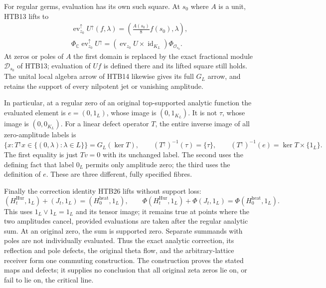 \documentclass[11pt]{article}
\theoremstyle{definition}
\begin{document}
For regular germs, evaluation has its own such square. At $s_0$ where
$A$ is a unit, HTB13 lifts to
\begin{equation}\tag{HTB32}
\begin{gathered}
 \operatorname{ev}_{z_0}^{\uparrow}U^{\uparrow}(f,\lambda)
 =\left(\frac{A(s_0)}8 f(s_0),\lambda\right),\\
 \Phi_{\mathbb C}\operatorname{ev}_{z_0}^{\uparrow}U^{\uparrow}
 =\left(\operatorname{ev}_{z_0}U\times\operatorname{id}_{K_L}\right)
       \Phi_{\mathcal O_{s_0}}.
\end{gathered}
\end{equation}
At zeros or poles of $A$ the first domain is replaced by the exact
fractional module $\mathcal D_{s_0}$ of HTB13; evaluation of $Uf$ is
defined there and its lifted square still holds. The unital local
algebra arrow of HTB14 likewise gives its full $G_L$ arrow, and
retains the support of every nilpotent jet or vanishing amplitude.

In particular, at a regular zero of an original top-supported analytic
function the evaluated element is $e=(0,1_L)$, whose image is
$(0,1_{K_L})$. It is not $\tau$, whose image is $(0,0_{K_L})$.
For a linear defect operator $T$, the entire inverse image of all
zero-amplitude labels is
\begin{equation}\tag{HTB33}
 \{x:T^{\uparrow}x\in\{(0,\lambda):\lambda\in L\}\}
      =G_L(\ker T),\qquad
 (T^{\uparrow})^{-1}(\tau)=\{\tau\},\qquad
 (T^{\uparrow})^{-1}(e)=\ker T\times\{1_L\}.
\end{equation}
The first equality is just $Tv=0$ with its unchanged label. The second
uses the defining fact that label $0_L$ permits only amplitude zero;
the third uses the definition of $e$. These are three different,
fully specified fibres.

Finally the correction identity HTB26 lifts without support loss:
\begin{equation}\tag{HTB34}
 (H_t^{\mathrm{Hur}},1_L)+(J_t,1_L)
   =(H_0^{\mathrm{heat}},1_L),\qquad
 \Phi(H_t^{\mathrm{Hur}},1_L)+\Phi(J_t,1_L)
   =\Phi(H_0^{\mathrm{heat}},1_L).
\end{equation}
This uses $1_L\vee1_L=1_L$ and its tensor image; it remains true at
points where the two amplitudes cancel, provided evaluations are
taken after the regular analytic sum. At an original zero, the sum
is supported zero. Separate summands with poles are not individually
evaluated. Thus the exact analytic correction, its reflection and pole
defects, the original theta flow, and the arbitrary-lattice receiver
form one commuting construction. The construction proves the stated
maps and defects; it supplies no conclusion that all original zeta
zeros lie on, or fail to lie on, the critical line.
\end{document}

